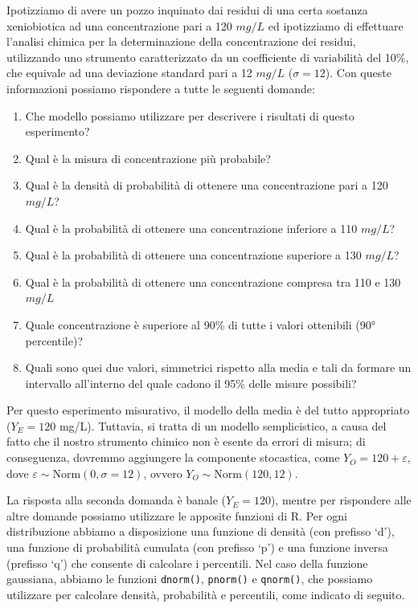 \documentclass[
  12pt,
]{book}
\providecommand{\tightlist}{%
  \setlength{\itemsep}{0pt}\setlength{\parskip}{0pt}}
\begin{document}
Ipotizziamo di avere un pozzo inquinato dai residui di una certa sostanza xeniobiotica ad una concentrazione pari a 120 \(mg/L\) ed ipotizziamo di effettuare l'analisi chimica per la determinazione della concentrazione dei residui, utilizzando uno strumento caratterizzato da un coefficiente di variabilità del 10\%, che equivale ad una deviazione standard pari a 12 \(mg/L\) (\(\sigma = 12\)). Con queste informazioni possiamo rispondere a tutte le seguenti domande:

\begin{enumerate}
\def\labelenumi{\arabic{enumi}.}
\tightlist
\item
  Che modello possiamo utilizzare per descrivere i risultati di questo esperimento?
\item
  Qual è la misura di concentrazione più probabile?
\item
  Qual è la densità di probabilità di ottenere una concentrazione pari a 120 \(mg/L\)?
\item
  Qual è la probabilità di ottenere una concentrazione inferiore a 110 \(mg/L\)?
\item
  Qual è la probabilità di ottenere una concentrazione superiore a 130 \(mg/L\)?
\item
  Qual è la probabilità di ottenere una concentrazione compresa tra 110 e 130 \(mg/L\)
\item
  Quale concentrazione è superiore al 90\% di tutte i valori ottenibili (90° percentile)?
\item
  Quali sono quei due valori, simmetrici rispetto alla media e tali da formare un intervallo all'interno del quale cadono il 95\% delle misure possibili?
\end{enumerate}

Per questo esperimento misurativo, il modello della media è del tutto appropriato (\(Y_E = 120\) mg/L). Tuttavia, si tratta di un modello semplicistico, a causa del fatto che il nostro strumento chimico non è esente da errori di misura; di conseguenza, dovremmo aggiungere la componente stocastica, come \(Y_O = 120 + \varepsilon\), dove \(\varepsilon \sim \textrm{Norm}(0, \sigma = 12)\), ovvero \(Y_O \sim \textrm{Norm}(120, 12)\).

La risposta alla seconda domanda è banale (\(Y_E = 120\)), mentre per rispondere alle altre domande possiamo utilizzare le apposite funzioni di R. Per ogni distribuzione abbiamo a disposizione una funzione di densità (con prefisso `d'), una funzione di probabilità cumulata (con prefisso `p') e una funzione inversa (prefisso `q') che consente di calcolare i percentili. Nel caso della funzione gaussiana, abbiamo le funzioni \texttt{dnorm()}, \texttt{pnorm()} e \texttt{qnorm()}, che possiamo utilizzare per calcolare densità, probabilità e percentili, come indicato di seguito.
\end{document}
